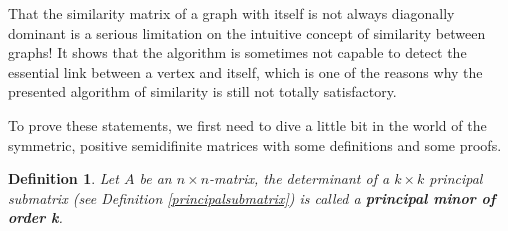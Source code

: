 \documentclass[a4paper,11pt]{report}
\newtheorem{definition}[theorem]{Definition}
\begin{document}
That the similarity matrix of a graph with itself is not always diagonally dominant is a serious limitation
on the intuitive concept of similarity between graphs! It shows that the 
algorithm is sometimes not capable to detect the essential link between a vertex and itself, which is one of 
the reasons why the presented algorithm of similarity is still not totally 
satisfactory.

To prove these statements, we first need to dive a little bit in the world of the 
symmetric, positive semidifinite matrices with some definitions and some proofs.

\begin{definition}
  Let $A$ be an $n \times n$-matrix, the determinant of a $k \times k$ principal submatrix (see Definition \ref{principalsubmatrix}) 
  is called a \textbf{principal minor of order k}.
\end{definition}
\end{document}
